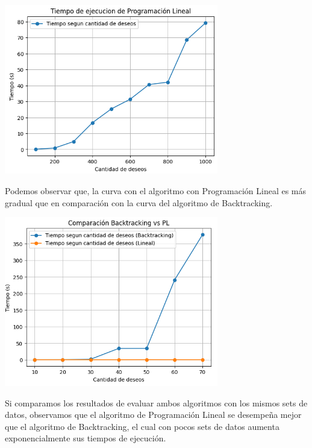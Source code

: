 \documentclass{estilo}
\begin{document}
\begin{center}
\includegraphics[width=0.7\textwidth]{img/tiempo_pl.png}

Podemos observar que, la curva con el algoritmo con Programación Lineal es más gradual que en comparación con la curva del algoritmo de Backtracking.
\end{center}

\begin{center}
\includegraphics[width=0.7\textwidth]{img/backtracking_vs_pl.png}

Si comparamos los resultados de evaluar ambos algoritmos con los mismos sets de datos, observamos que el algoritmo de Programación Lineal se desempeña mejor que el algoritmo de Backtracking, el cual con pocos sets de datos aumenta exponencialmente sus tiempos de ejecución.
\end{center}
\end{document}
